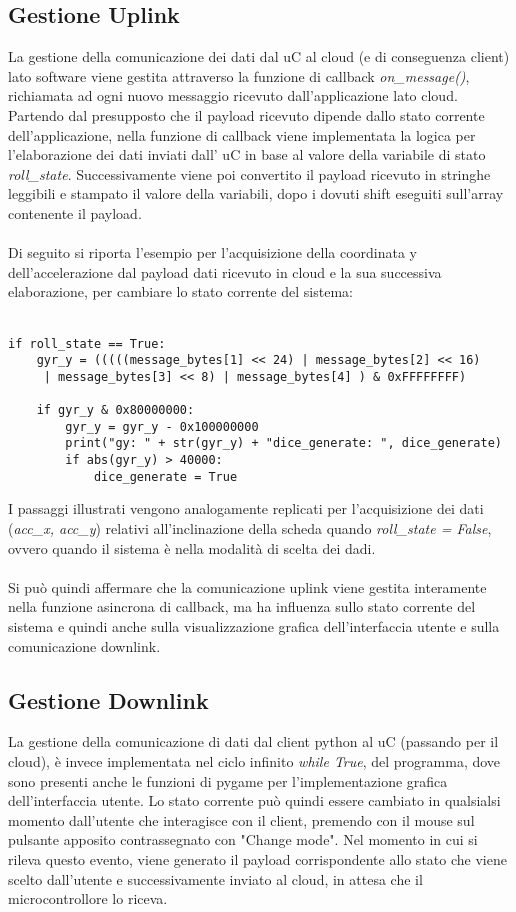 \subsection{Gestione Uplink}
La gestione della comunicazione dei dati dal uC al cloud (e di conseguenza client) lato software viene gestita attraverso la funzione di callback 
\textit{on\_message()}, richiamata ad ogni nuovo messaggio ricevuto dall'applicazione lato cloud. Partendo dal presupposto che il payload ricevuto
dipende dallo stato corrente dell'applicazione, nella funzione di callback viene implementata la logica per l'elaborazione dei dati inviati dall' uC in base al valore
della variabile di stato \textit{roll\_state}. Successivamente viene poi convertito il payload ricevuto in stringhe leggibili e stampato il valore della variabili, 
dopo i dovuti shift eseguiti sull'array contenente il payload.
\\\\Di seguito si riporta l'esempio per l'acquisizione della coordinata y dell'accelerazione dal payload dati ricevuto in cloud e la sua 
successiva elaborazione, per cambiare lo stato corrente del sistema:\\\\
\begin{verbatim}
if roll_state == True:
    gyr_y = (((((message_bytes[1] << 24) | message_bytes[2] << 16)
     | message_bytes[3] << 8) | message_bytes[4] ) & 0xFFFFFFFF)  

    if gyr_y & 0x80000000:
        gyr_y = gyr_y - 0x100000000
        print("gy: " + str(gyr_y) + "dice_generate: ", dice_generate)
        if abs(gyr_y) > 40000:
            dice_generate = True
\end{verbatim}
I passaggi illustrati vengono analogamente replicati per l'acquisizione dei dati (\textit{acc\_x, acc\_y}) relativi all'inclinazione della scheda
quando \textit{roll\_state = False}, ovvero quando il sistema è nella modalità di scelta dei dadi.
\\\\Si può quindi affermare che la comunicazione uplink viene gestita interamente nella funzione asincrona di callback, ma ha influenza 
sullo stato corrente del sistema e quindi anche sulla visualizzazione grafica dell'interfaccia utente e sulla comunicazione downlink.

\subsection{Gestione Downlink}
La gestione della comunicazione di dati dal client python al uC (passando per il cloud), è invece implementata nel ciclo infinito \textit{while True}, 
del programma, dove sono presenti anche le funzioni di pygame per l'implementazione grafica dell'interfaccia utente.
Lo stato corrente può quindi essere cambiato in qualsialsi momento dall'utente che interagisce con il client, premendo con il mouse sul pulsante
apposito contrassegnato con "Change mode". Nel momento in cui si rileva questo evento, viene generato il payload corrispondente allo stato che viene 
scelto dall'utente e successivamente inviato al cloud, in attesa che il microcontrollore lo riceva.



